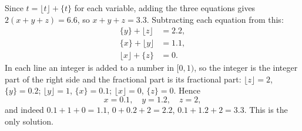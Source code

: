 Since $t=\lfloor t\rfloor+\{t\}$ for each variable, adding the three equations gives $2(x+y+z)=6.6$, so $x+y+z=3.3$. Subtracting each equation from this:
\begin{align*}
\{y\}+\lfloor z\rfloor&=2.2,\\
\{x\}+\lfloor y\rfloor&=1.1,\\
\lfloor x\rfloor+\{z\}&=0 .
\end{align*}
In each line an integer is added to a number in $[0,1)$, so the integer is the integer part of the right side and the fractional part is its fractional part: $\lfloor z\rfloor=2$, $\{y\}=0.2$; $\lfloor y\rfloor=1$, $\{x\}=0.1$; $\lfloor x\rfloor=0$, $\{z\}=0$. Hence
\[
\boxed{x=0.1,\quad y=1.2,\quad z=2},
\]
and indeed $0.1+1+0=1.1$, $0+0.2+2=2.2$, $0.1+1.2+2=3.3$. This is the only solution.
